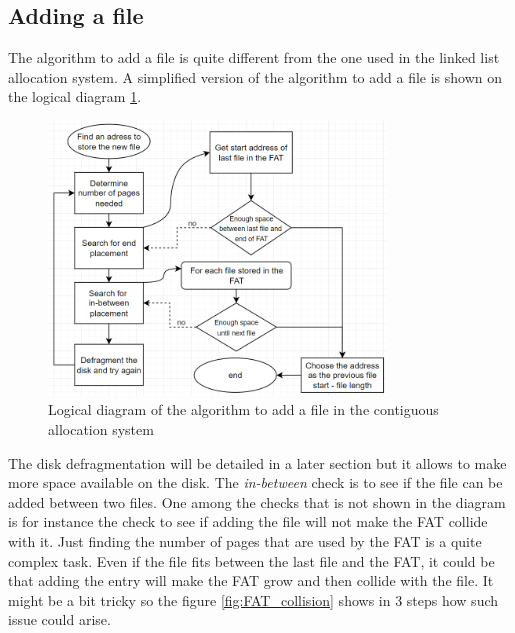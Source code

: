 \documentclass[10pt,a4paper]{ULBreport}
\begin{document}
\subsection{Adding a file}
The algorithm to add a file is quite different from the one used in the linked list allocation system. A simplified version of the algorithm to add a file is shown on the logical diagram \ref{fig:Logic_add_CA}.\\
\begin{figure}
    \centering
    \includegraphics[width=0.8\textwidth]{Logic_add_CA.png}
    \caption{Logical diagram of the algorithm to add a file in the contiguous allocation system}
    \label{fig:Logic_add_CA}
\end{figure}
The disk defragmentation will be detailed in a later section but it allows to make more space available on the disk. The \textit{in-between} check is to see if the file can be added between two files.  
One among the checks that is not shown in the diagram is for instance the check to see if adding the file will not make the FAT collide with it. Just finding the number of pages that are used by the FAT is a quite complex task. Even if the file fits between the last file and the FAT, it could be that adding the entry will make the FAT grow and then collide with the file. It might be a bit tricky so the figure \ref{fig:FAT_collision} shows in 3 steps how such issue could arise. \\
\end{document}
